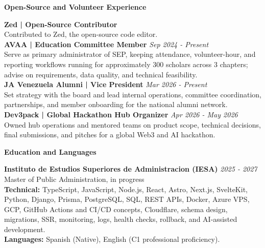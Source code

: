 \documentclass[10pt]{article}
\newcommand{\sectiontitle}[1]{%
    \vspace{4pt}
    \begin{center}
        \textbf{#1}
    \end{center}
    \vspace{-5pt}
}
\begin{document}
\sectiontitle{Open-Source and Volunteer Experience}
\textbf{Zed | Open-Source Contributor} \\
Contributed to Zed, the open-source code editor. \\
\textbf{AVAA | Education Committee Member} \hfill \textit{Sep 2024 - Present} \\
Serve as primary administrator of SEP, keeping attendance, volunteer-hour, and reporting workflows running for approximately 300 scholars across 3 chapters; advise on requirements, data quality, and technical feasibility. \\
\textbf{JA Venezuela Alumni | Vice President} \hfill \textit{Mar 2026 - Present} \\
Set strategy with the board and lead internal operations, committee coordination, partnerships, and member onboarding for the national alumni network. \\
\textbf{Dev3pack | Global Hackathon Hub Organizer} \hfill \textit{Apr 2026 - May 2026} \\
Owned hub operations and mentored teams on product scope, technical decisions, final submissions, and pitches for a global Web3 and AI hackathon.

\sectiontitle{Education and Languages}
\textbf{Instituto de Estudios Superiores de Administracion (IESA)} \hfill \textit{2025 - 2027} \\
Master of Public Administration, in progress \\
\textbf{Technical:} TypeScript, JavaScript, Node.js, React, Astro, Next.js, SvelteKit, Python, Django, Prisma, PostgreSQL, SQL, REST APIs, Docker, Azure VPS, GCP, GitHub Actions and CI/CD concepts, Cloudflare, schema design, migrations, SSR, monitoring, logs, health checks, rollback, and AI-assisted development. \\
\textbf{Languages:} Spanish (Native), English (C1 professional proficiency).
\end{document}
